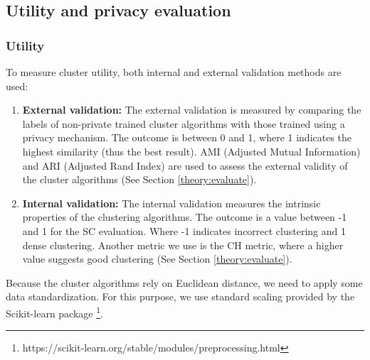 \subsection{Utility and privacy evaluation}
\subsubsection*{Utility}
To measure cluster utility, both internal and external validation methods are used:
{}
\begin{enumerate}
  \item \textbf{External validation: }
        The external validation is measured by comparing the labels of non-private trained cluster algorithms with those trained using a privacy mechanism.
        The outcome is between 0 and 1, where 1 indicates the highest similarity (thus the best result).
        AMI (Adjusted Mutual Information) and ARI (Adjusted Rand Index) are used to assess the external validity of the cluster algorithms (See Section \ref{theory:evaluate}).
  \item \textbf{Internal validation: }
        The internal validation measures the intrinsic properties of the clustering algorithms.
        The outcome is a value between -1 and 1 for the SC evaluation.
        Where -1 indicates incorrect clustering and 1 dense clustering.
        Another metric we use is the CH metric, where a higher value suggests good clustering (See Section \ref{theory:evaluate}).
\end{enumerate}
Because the cluster algorithms rely on Euclidean distance, we need to apply some data standardization.
For this purpose, we use standard scaling provided by the Scikit-learn package \footnote{https://scikit-learn.org/stable/modules/preprocessing.html}.

